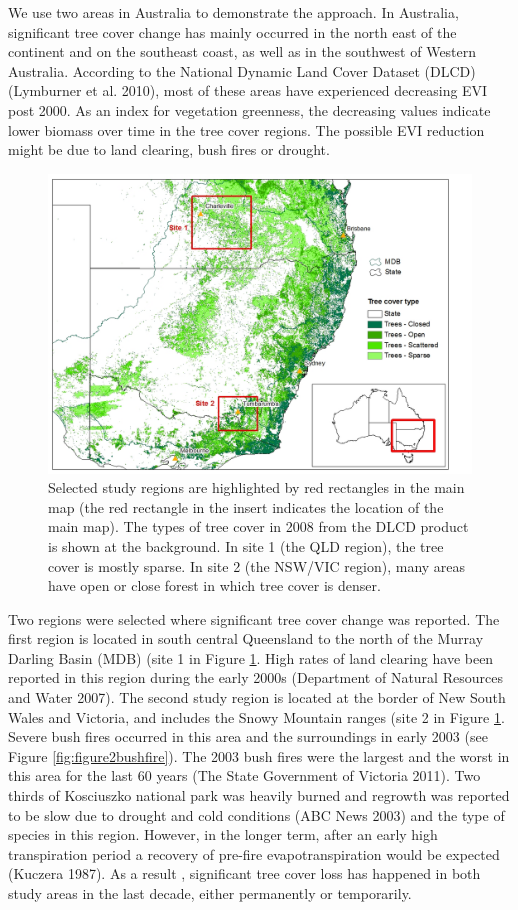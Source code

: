 \documentclass[]{elsarticle} %
\theoremstyle{definition}
\theoremstyle{definition}
\theoremstyle{definition}
\theoremstyle{remark}
\begin{document}
We use two areas in Australia to demonstrate the approach. In Australia,
significant tree cover change has mainly occurred in the north east of
the continent and on the southeast coast, as well as in the southwest of
Western Australia. According to the National Dynamic Land Cover Dataset
(DLCD) (Lymburner et al. 2010), most of these areas have experienced
decreasing EVI post 2000. As an index for vegetation greenness, the
decreasing values indicate lower biomass over time in the tree cover
regions. The possible EVI reduction might be due to land clearing, bush
fires or drought.

\begin{figure}
\includegraphics[width=0.9\linewidth]{figures/map_selreg} \caption{Selected study regions are highlighted by red rectangles in the main map (the red rectangle in the insert indicates the location of the main map). The types of tree cover in 2008 from the DLCD product is shown at the background. In site 1 (the QLD region), the tree cover is mostly sparse. In site 2 (the NSW/VIC region), many areas have open or close forest in which tree cover is denser.}\label{fig:selreg}
\end{figure}

Two regions were selected where significant tree cover change was
reported. The first region is located in south central Queensland to the
north of the Murray Darling Basin (MDB) (site 1 in Figure
\ref{fig:selreg}. High rates of land clearing have been reported in this
region during the early 2000s (Department of Natural Resources and Water
2007). The second study region is located at the border of New South
Wales and Victoria, and includes the Snowy Mountain ranges (site 2 in
Figure \ref{fig:selreg}. Severe bush fires occurred in this area and the
surroundings in early 2003 (see Figure \ref{fig:figure2bushfire}). The
2003 bush fires were the largest and the worst in this area for the last
60 years (The State Government of Victoria 2011). Two thirds of
Kosciuszko national park was heavily burned and regrowth was reported to
be slow due to drought and cold conditions (ABC News 2003) and the type
of species in this region. However, in the longer term, after an early
high transpiration period a recovery of pre-fire evapotranspiration
would be expected (Kuczera 1987). As a result , significant tree cover
loss has happened in both study areas in the last decade, either
permanently or temporarily.
\end{document}
